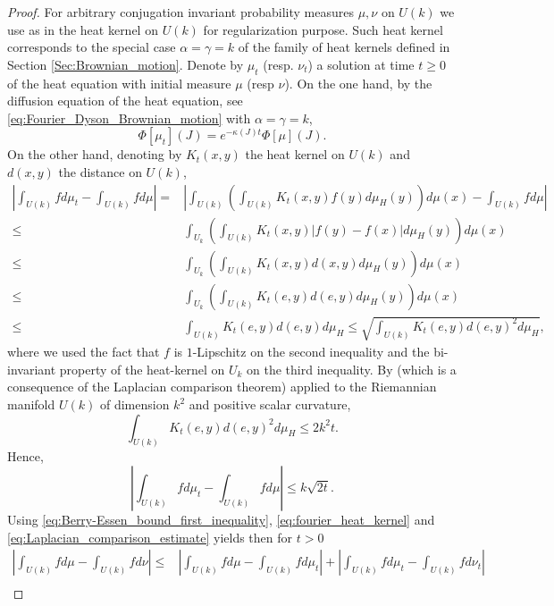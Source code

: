 \documentclass[10pt,11pt]{amsart}%
\begin{document}
\begin{proof}
For arbitrary conjugation invariant probability measures $\mu,\nu$ on $U(k)$ we use as in \cite{BobLed} the heat kernel on $U(k)$ for regularization purpose. Such heat kernel corresponds to the special case $\alpha=\gamma=k$ of the family of heat kernels defined in Section \ref{Sec:Brownian_motion}. Denote by $\mu_t$ (resp. $\nu_t$) a solution at time $t\geq 0$ of the heat equation with initial measure $\mu$ (resp $\nu$). On the one hand, by the diffusion equation of the heat equation, see \eqref{eq:Fourier_Dyson_Brownian_motion} with $\alpha=\gamma=k$,
\begin{equation}\label{eq:fourier_heat_kernel}
\Phi[\mu_t](J)=e^{-\kappa(J)t}\Phi[\mu](J).
\end{equation}
On the other hand, denoting by $K_t(x,y)$ the heat kernel on $U(k)$ and $d(x,y)$ the distance on $U(k)$,
\begin{align*}
\left\vert\int_{U(k)}fd\mu_t-\int_{U(k)}fd\mu\right\vert=& \left\vert\int_{U(k)}\left(\int_{U(k)}K_t(x,y)f(y)d\mu_H(y)\right)d\mu(x)-\int_{U(k)}fd\mu\right\vert\\\leq&\int_{U_k}\left(\int_{U(k)}K_t(x,y)\left\vert f(y)-f(x)\right\vert d\mu_H(y)\right)d\mu(x)\\
\leq&\int_{U_k}\left(\int_{U(k)}K_t(x,y)d(x,y)d\mu_H(y)\right)d\mu(x)\\
\leq&\int_{U_k}\left(\int_{U(k)}K_t(e,y)d(e,y)d\mu_H(y)\right)d\mu(x)\\
\leq&\int_{U(k)}K_t(e,y)d(e,y)d\mu_H \leq \sqrt{\int_{U(k)}K_t(e,y)d(e,y)^2d\mu_H},
\end{align*}
where we used the fact that $f$ is $1$-Lipschitz on the second inequality and the bi-invariant property of the heat-kernel on $U_k$ on the third inequality. By \cite[Lemma 6]{Bord} (which is a consequence of the Laplacian comparison theorem) applied to the Riemannian manifold $U(k)$ of dimension $k^2$ and positive scalar curvature,
$$\int_{U(k)}K_t(e,y)d(e,y)^2d\mu_H\leq 2k^2t.$$
Hence,
\begin{equation}\label{eq:Laplacian_comparison_estimate}
\left\vert\int_{U(k)}fd\mu_t-\int_{U(k)}fd\mu\right\vert\leq k\sqrt{2t}.
\end{equation}
Using \eqref{eq:Berry-Essen_bound_first_inequality}, \eqref{eq:fourier_heat_kernel} and \eqref{eq:Laplacian_comparison_estimate} yields then for $t>0$
\begin{align*}
\left\vert\int_{U(k)}fd\mu-\int_{U(k)}fd\nu\right\vert\leq& \left\vert\int_{U(k)}fd\mu-\int_{U(k)}fd\mu_t\right\vert+\left\vert\int_{U(k)}fd\mu_t-\int_{U(k)}fd\nu_t\right\vert\\

\end{align*}
\end{proof}
\end{document}
